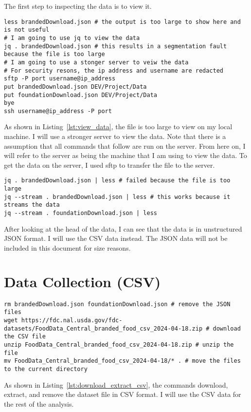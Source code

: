 \documentclass{article}
\begin{document}
The first step to inspecting the data is to view it.

\begin{lstlisting}[caption={View the Data}, label={lst:view_data}]
less brandedDownload.json # the output is too large to show here and is not useful
# I am going to use jq to view the data
jq . brandedDownload.json # this results in a segmentation fault because the file is too large
# I am going to use a stonger server to veiw the data 
# For security resons, the ip address and username are redacted
sftp -P port username@ip_address
put brandedDownload.json DEV/Project/Data
put foundationDownload.json DEV/Project/Data
bye
ssh username@ip_address -P port
\end{lstlisting}

As shown in Listing~\ref{lst:view_data}, the file is too large to view on my local machine. I will use a stronger server to view the data. Note that there is a assumption that all commands that follow are run on the server. From here on, I will refer to the server as being the machine that I am using to view the data. To get the data on the server, I used sftp to transfer the file to the server. 

\begin{lstlisting}[caption={View the Data on the Server}, label={lst:view_data_server}]
jq . brandedDownload.json | less # failed because the file is too large
jq --stream . brandedDownload.json | less # this works because it streams the data
jq --stream . foundationDownload.json | less

\end{lstlisting}

After looking at the head of the data, I can see that the data is in unstructured JSON format. I will use the CSV data instead. The JSON data will not be included in this document for size reasons.

\section{Data Collection (CSV)}
\begin{lstlisting}[caption={Download, Extract, and Remove Zip File}, label={lst:download_extract_csv}]
rm brandedDownload.json foundationDownload.json # remove the JSON files
wget https://fdc.nal.usda.gov/fdc-datasets/FoodData_Central_branded_food_csv_2024-04-18.zip # download the CSV file
unzip FoodData_Central_branded_food_csv_2024-04-18.zip # unzip the file
mv FoodData_Central_branded_food_csv_2024-04-18/* . # move the files to the current directory
\end{lstlisting}
As shown in Listing~\ref{lst:download_extract_csv}, the commands download, extract, and remove the dataset file in CSV format. I will use the CSV data for the rest of the analysis.
\end{document}
